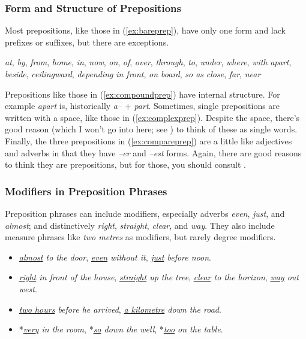 \subsubsection*{Form and Structure of Prepositions}

Most prepositions, like those in (\ref{ex:bareprep}), have only one form and lack prefixes or suffixes, but there are exceptions.

\ea 
   \ea \textit{at}, \textit{by}, \textit{from}, \textit{home}, \textit{in}, \textit{now}, \textit{on}, \textit{of}, \textit{over}, \textit{through}, \textit{to}, \textit{under}, \textit{where}, \textit{with} \label{ex:bareprep}
   \ex \textit{apart}, \textit{beside}, \textit{ceilingward}, \textit{depending} \label{ex:compoundprep}
   \ex \textit{in front}, \textit{on board}, \textit{so as} \label{ex:complexprep}
   \ex \textit{close}, \textit{far}, \textit{near} \label{ex:compareprep}
   \z
\z

\noindent Prepositions like those in (\ref{ex:compoundprep}) have internal structure. For example \textit{apart} is, historically \textit{a--} + \textit{part}. Sometimes, single prepositions are written with a space, like those in (\ref{ex:complexprep}). Despite the space, there's good reason (which I won't go into here; see \cite[622]{Huddleston2002}) to think of these as single words. Finally, the three prepositions in (\ref{ex:compareprep}) are a little like adjectives and adverbs in that they have \textit{--er} and \textit{--est} forms. Again, there are good reasons to think they are prepositions, but for those, you should consult \textcite[609]{Huddleston2002}.

\subsubsection*{Modifiers in Preposition Phrases}

Preposition phrases can include modifiers, especially adverbs \textit{even}, \textit{just}, and \textit{almost}; and distinctively \textit{right}, \textit{straight}, \textit{clear}, and \textit{way}. They also include measure phrases like \textit{two metres} as modifiers, but rarely degree modifiers.

\begin{itemize}
   \item \textit{\uline{almost} to the door}, \textit{\uline{even} without it},  \textit{\uline{just} before noon}.
   \item \textit{\uline{right} in front of the house}, \textit{\uline{straight} up the tree}, \textit{\uline{clear} to the horizon}, \textit{\uline{way} out west}.
   \item \textit{\uline{two hours} before he arrived}, \textit{\uline{a kilometre} down the road}.
   \item *\textit{\uline{very} in the room}, *\textit{\uline{so} down the well}, *\textit{\uline{too} on the table}.
\end{itemize}

